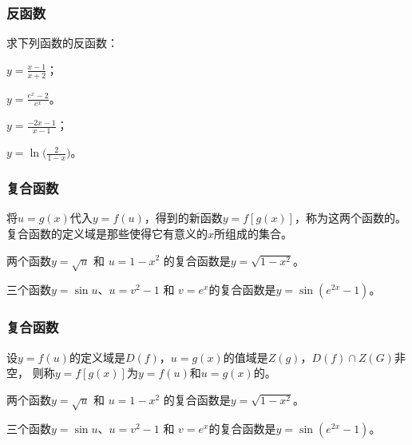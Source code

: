 \documentclass[14pt,notheorems,leqno,xcolor={rgb}]{beamer} %
\begin{document}
\begin{oframe}
\frametitle{反函数}
\begin{exercise}
求下列函数的反函数：
\begin{multicols}{2}
\begin{enumlite}
  \item $y=\frac{x-1}{x+2}$；
  \item $y=\frac{e^x-2}{e^x}$。
\end{enumlite}
\end{multicols}
\end{exercise}
\vpause
\begin{solution}
\begin{multicols}{2}
\begin{enumlite}
  \item $y=\frac{-2x-1}{x-1}$；
  \item $y=\ln\big(\frac{2}{1-x}\big)$。
\end{enumlite}
\end{multicols}
\end{solution}
\end{oframe}

\begin{oframe}
\frametitle{复合函数}
\begin{definition*}
将$u=g(x)$代入$y=f(u)$，得到的新函数$y=f[g(x)]$，称为这两个函数的。\pause
复合函数的定义域是那些使得它有意义的$x$所组成的集合。
\end{definition*}
\vpause
\begin{example*}
两个函数$y=\sqrt{u}$ 和 $u=1-x^2$ 的复合函数是$y=\sqrt{1-x^2}$。
\end{example*}
\vpause
\begin{example*}
三个函数$y=\sin u$、$u=v^2-1$ 和 $v=e^x$的复合函数是$y=\sin(e^{2x}-1)$。
\end{example*}
\end{oframe}

\begin{iframe}
\frametitle{复合函数}
\begin{definition}
设$y=f(u)$的定义域是$D(f)$，$u=g(x)$的值域是$Z(g)$，$D(f)\cap Z(G)$非空，
则称$y=f[g(x)]$为$y=f(u)$和$u=g(x)$的。
\end{definition}
\vpause
\begin{example}
两个函数$y=\sqrt{u}$ 和 $u=1-x^2$ 的复合函数是$y=\sqrt{1-x^2}$。
\end{example}
\vpause
\begin{example}
三个函数$y=\sin u$、$u=v^2-1$ 和 $v=e^x$的复合函数是$y=\sin(e^{2x}-1)$。
\end{example}
\end{iframe}
\end{document}
